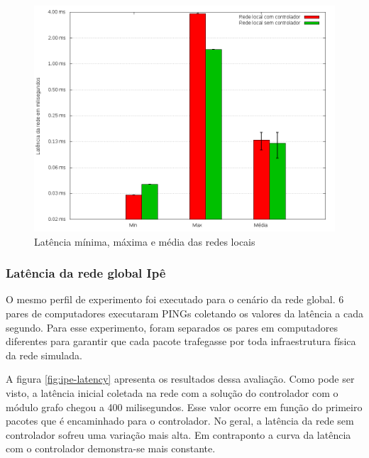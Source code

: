 \begin{figure}[!htb]
    \centering
    \label{fig:local-latency-stats}
    \includegraphics[width=\linewidth]{img/local-latency-stats}
    \caption{Latência mínima, máxima e média das redes locais}
\end{figure}


\subsubsection{Latência da rede global Ipê}

O mesmo perfil de experimento foi executado para o cenário da rede global.
6 pares de computadores executaram PINGs coletando os valores da latência
a cada segundo.
Para esse experimento, foram separados os pares em computadores diferentes 
para garantir que cada pacote trafegasse por toda infraestrutura física da 
rede simulada. 

A figura \ref{fig:ipe-latency} apresenta os resultados dessa avaliação.
Como pode ser visto, a latência inicial coletada na rede com a solução do 
controlador com o módulo grafo chegou a 400 milisegundos.
Esse valor ocorre em função do primeiro pacotes que é encaminhado para o 
controlador.
No geral, a latência da rede sem controlador sofreu uma variação mais alta.
Em contraponto a curva da latência com o controlador demonstra-se mais 
constante.

